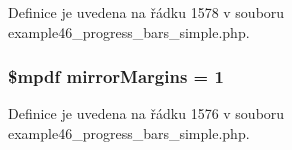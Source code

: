 Definice je uvedena na řádku 1578 v souboru example46\-\_\-progress\-\_\-bars\-\_\-simple.\-php.

\hypertarget{example46__progress__bars__simple_8php_a24c284cb7774410f65953584ea1fd9c1}{
\subsubsection[{mirror\-Margins}]{\setlength{\rightskip}{0pt plus 5cm}\$mpdf mirror\-Margins = 1}}\label{example46__progress__bars__simple_8php_a24c284cb7774410f65953584ea1fd9c1}


Definice je uvedena na řádku 1576 v souboru example46\-\_\-progress\-\_\-bars\-\_\-simple.\-php.

